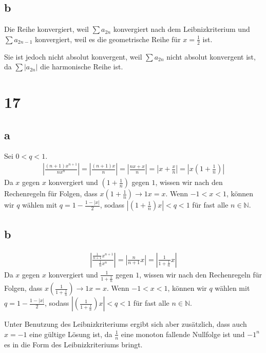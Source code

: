 \documentclass[a4paper,10pt]{article}
\begin{document}
\subsection*{b}

Die Reihe konvergiert, weil $\sum a_{2n}$ konvergiert nach dem Leibnizkriterium und $\sum a_{2n - 1}$ konvergiert, weil es die geometrische Reihe für $x = \frac{1}{2}$ ist.

Sie ist jedoch nicht absolut konvergent, weil $\sum a_{2n}$ nicht absolut konvergent ist, da $\sum |a_{2n}|$ die harmonische Reihe ist. 

\section*{17}

\subsection*{a}

Sei $0 < q < 1$.
\begin{align}
 |\frac{(n + 1)x^{n + 1}}{nx^n}| = |\frac{(n + 1)x}{n}| = |\frac{nx + x}{n}| = |x + \frac{x}{n}| = |x(1 + \frac{1}{n})|
\end{align}
Da $x$ gegen $x$ konvergiert und $(1 + \frac{1}{n})$ gegen $1$, wissen wir nach den Rechenregeln für Folgen, dass $x(1 + \frac{1}{n}) \rightarrow 1x = x$.
Wenn $-1 < x < 1$, können wir $q$ wählen mit $q = 1 - \frac{1 - |x|}{2}$, sodass $|(1 + \frac{1}{n})x| < q < 1$ für fast alle $n \in \mathbb{N}$.

\subsection*{b}

\begin{align}
 |\frac{\frac{1}{n + 1}x^{n + 1}}{\frac{1}{n}x^n}| = |\frac{n}{n + 1}x| = |\frac{1}{1 + \frac{1}{n}}x|
\end{align}
Da $x$ gegen $x$ konvergiert und $\frac{1}{1 + \frac{1}{n}}$ gegen $1$, wissen wir nach den Rechenregeln für Folgen, dass $x(\frac{1}{1 + \frac{1}{n}}) \rightarrow 1x = x$.
Wenn $-1 < x < 1$, können wir $q$ wählen mit $q = 1 - \frac{1 - |x|}{2}$, sodass $|(\frac{1}{1 + \frac{1}{n}})x| < q < 1$ für fast alle $n \in \mathbb{N}$.

Unter Benutzung des Leibnizkriteriums ergibt sich aber zusätzlich, dass auch $x = -1$ eine gültige Lösung ist, da $\frac{1}{n}$ eine monoton fallende Nullfolge ist und $-1^n$ es in die Form des Leibnizkriteriums bringt.
\end{document}
